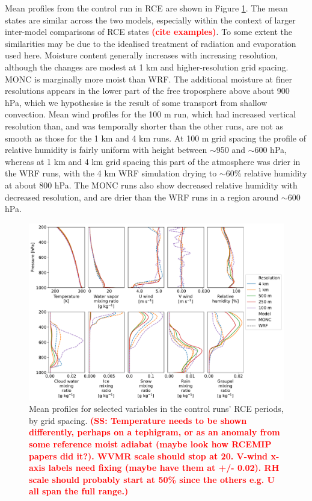 \documentclass[draft]{agujournal2019}
\newcommand{\todo}[1]{\textcolor{red}{\textbf{(#1)}}}
\begin{document}
Mean profiles from the control run in RCE are shown in Figure
\ref{fig:rce_profiles}. The mean states are similar across the two models,
especially within the context of larger inter-model comparisons of RCE states
\todo{cite examples}. To some extent the similarities may be due to the
idealised treatment of radiation and evaporation used here. Moisture content
generally increases with increasing resolution, although the changes are modest
at 1 km and higher-resolution grid spacing. MONC is marginally more moist than
WRF. The additional moisture at finer resolutions appears in the lower part of
the free troposphere above about 900 hPa, which we hypothesise is the result of
some transport from shallow convection. Mean wind profiles for the 100 m run,
which had increased vertical resolution than, and was temporally shorter than
the other runs, are not as smooth as those for the 1 km and 4 km runs. At 100 m
grid spacing the profile of relative humidity is fairly uniform with height
between $\sim$950 and $\sim$600 hPa, whereas at 1 km and 4 km grid spacing this
part of the atmosphere was drier in the WRF runs, with the 4 km WRF simulation
drying to $\sim$60\% relative humidity at about 800 hPa. The MONC runs also show
decreased relative humidity with decreased resolution, and are drier than the
WRF runs in a region around $\sim$600 hPa.

\begin{figure}[pth]
    \noindent\includegraphics[width=\textwidth]{figures/rce_profiles}
    \caption{Mean profiles for selected variables in the control runs' RCE
    periods, by grid spacing. \todo{SS: Temperature needs to be shown differently, perhaps on a tephigram, or as an anomaly from some reference moist adiabat (maybe look how RCEMIP papers did it?).  WVMR scale should stop at 20.  V-wind x-axis labels need fixing (maybe have them at +/- 0.02).  RH scale should probably start at 50\% since the others e.g. U all span the full range.}}
    \label{fig:rce_profiles}
\end{figure}
\end{document}
